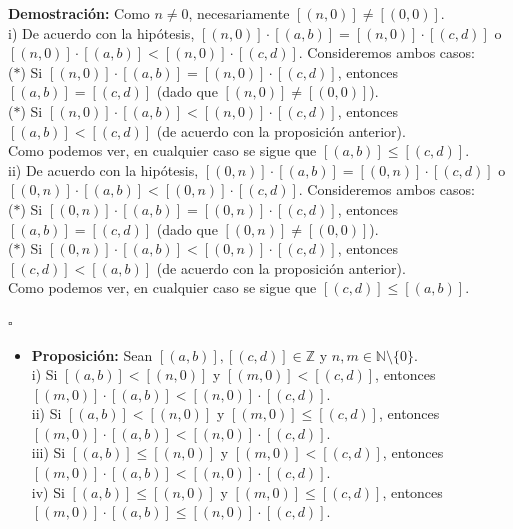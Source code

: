 \documentclass[10 pt]{article}
\begin{document}
\Large{\textbf{Demostración:} Como $n \neq 0$, necesariamente $[(n,0)] \neq [(0,0)]$. \\

i) De acuerdo con la hipótesis, $[(n,0)] \cdot [(a,b)]=[(n,0)] \cdot [(c,d)]$ o $[(n,0)] \cdot [(a,b)]<[(n,0)] \cdot [(c,d)]$. Consideremos ambos casos:  \\

($\ast$) Si $[(n,0)] \cdot [(a,b)]=[(n,0)] \cdot [(c,d)]$, entonces $[(a,b)]=[(c,d)]$ (dado que $[(n,0)] \neq [(0,0)]$). \\

($\ast$) Si $[(n,0)] \cdot [(a,b)]<[(n,0)] \cdot [(c,d)]$, entonces $[(a,b)]<[(c,d)]$ (de acuerdo con la proposición anterior). \\

Como podemos ver, en cualquier caso se sigue que $[(a,b)] \leq [(c,d)]$. \\

ii)  De acuerdo con la hipótesis, $[(0,n)] \cdot [(a,b)]=[(0,n)] \cdot [(c,d)]$ o $[(0,n)] \cdot [(a,b)]<[(0,n)] \cdot [(c,d)]$. Consideremos ambos casos:  \\

($\ast$) Si $[(0,n)] \cdot [(a,b)]=[(0,n)] \cdot [(c,d)]$, entonces $[(a,b)]=[(c,d)]$ (dado que $[(0,n)] \neq [(0,0)]$). \\

($\ast$) Si $[(0,n)] \cdot [(a,b)]<[(0,n)] \cdot [(c,d)]$, entonces $[(c,d)]<[(a,b)]$ (de acuerdo con la proposición anterior). \\

Como podemos ver, en cualquier caso se sigue que $[(c,d)] \leq [(a,b)]$.} \\

\begin{flushright}
    $\square$
\end{flushright}

\begin{itemize}
    \item \Large{\textbf{Proposición:} Sean $[(a,b)],[(c,d)] \in \mathbb Z$ y $n,m \in \mathbb N \setminus \{0\}$. \\

    i) Si $[(a,b)]<[(n,0)]$ y $[(m,0)]<[(c,d)]$, entonces $[(m,0)] \cdot [(a,b)]<[(n,0)] \cdot [(c,d)]$. \\

    ii) Si $[(a,b)]<[(n,0)]$ y $[(m,0)] \leq [(c,d)]$, entonces $[(m,0)] \cdot [(a,b)]<[(n,0)] \cdot [(c,d)]$. \\

    iii) Si $[(a,b)] \leq [(n,0)]$ y $[(m,0)]<[(c,d)]$, entonces $[(m,0)] \cdot [(a,b)]<[(n,0)] \cdot [(c,d)]$. \\

    iv) Si $[(a,b)] \leq [(n,0)]$ y $[(m,0)] \leq [(c,d)]$, entonces $[(m,0)] \cdot [(a,b)] \leq [(n,0)] \cdot [(c,d)]$. \\ } \\
\end{itemize}
\end{document}
